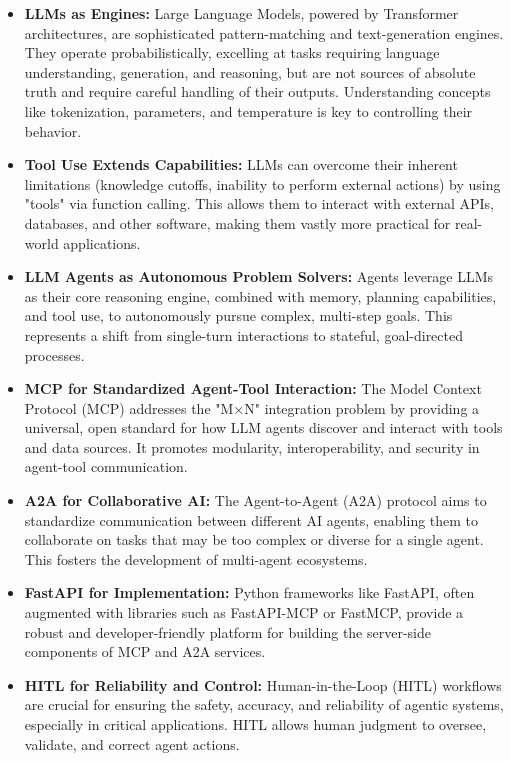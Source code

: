 \begin{itemize}
    \item \textbf{LLMs as Engines:} Large Language Models, powered by Transformer architectures, are sophisticated pattern-matching 
    and text-generation engines. They operate probabilistically, excelling at tasks requiring language understanding, generation, 
    and reasoning, but are not sources of absolute truth and require careful handling of their outputs. Understanding concepts like 
    tokenization, parameters, and temperature is key to controlling their behavior.
    \item \textbf{Tool Use Extends Capabilities:} LLMs can overcome their inherent limitations (knowledge cutoffs, inability to perform 
    external actions) by using "tools" via function calling. This allows them to interact with external APIs, databases, and other software, 
    making them vastly more practical for real-world applications.
    \item \textbf{LLM Agents as Autonomous Problem Solvers:} Agents leverage LLMs as their core reasoning engine, combined with memory, 
    planning capabilities, and tool use, to autonomously pursue complex, multi-step goals. This represents a shift from single-turn interactions to stateful, 
    goal-directed processes.
    \item \textbf{MCP for Standardized Agent-Tool Interaction:} The Model Context Protocol (MCP) addresses the "M×N" integration problem by 
    providing a universal, open standard for how LLM agents discover and interact with tools and data sources. It promotes modularity, 
    interoperability, and security in agent-tool communication.
    \item \textbf{A2A for Collaborative AI:} The Agent-to-Agent (A2A) protocol aims to standardize communication between different AI agents, 
    enabling them to collaborate on tasks that may be too complex or diverse for a single agent. This fosters the development of multi-agent ecosystems.
    \item \textbf{FastAPI for Implementation:} Python frameworks like FastAPI, often augmented with libraries such as FastAPI-MCP or FastMCP, 
    provide a robust and developer-friendly platform for building the server-side components of MCP and A2A services.
    \item \textbf{HITL for Reliability and Control:} Human-in-the-Loop (HITL) workflows are crucial for ensuring the safety, accuracy, 
    and reliability of agentic systems, especially in critical applications. HITL allows human judgment to oversee, validate, and correct agent actions.
\end{itemize}

